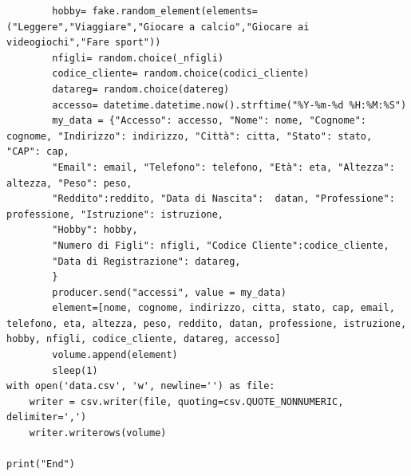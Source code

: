 \documentclass{article}
\begin{document}
\begin{lstlisting}
        hobby= fake.random_element(elements=("Leggere","Viaggiare","Giocare a calcio","Giocare ai videogiochi","Fare sport"))
        nfigli= random.choice(_nfigli)
        codice_cliente= random.choice(codici_cliente)
        datareg= random.choice(datereg)
        accesso= datetime.datetime.now().strftime("%Y-%m-%d %H:%M:%S")
        my_data = {"Accesso": accesso, "Nome": nome, "Cognome": cognome, "Indirizzo": indirizzo, "Città": citta, "Stato": stato, "CAP": cap,
        "Email": email, "Telefono": telefono, "Età": eta, "Altezza": altezza, "Peso": peso,
        "Reddito":reddito, "Data di Nascita":  datan, "Professione":  professione, "Istruzione": istruzione,
        "Hobby": hobby,
        "Numero di Figli": nfigli, "Codice Cliente":codice_cliente, 
        "Data di Registrazione": datareg, 
        }
        producer.send("accessi", value = my_data) 
        element=[nome, cognome, indirizzo, citta, stato, cap, email, telefono, eta, altezza, peso, reddito, datan, professione, istruzione, hobby, nfigli, codice_cliente, datareg, accesso]
        volume.append(element)
        sleep(1)
with open('data.csv', 'w', newline='') as file:
    writer = csv.writer(file, quoting=csv.QUOTE_NONNUMERIC, delimiter=',')
    writer.writerows(volume) 

print("End")
     

\end{lstlisting}
\end{document}
